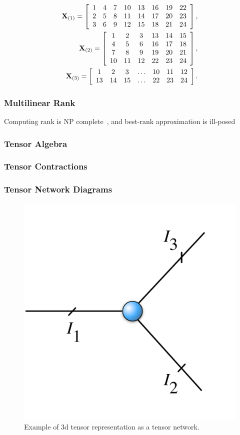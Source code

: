 \begin{equation}
\label{eq:moden-matricization}
\begin{split}
\M{X}_{(1)} = \left[
\begin{array}{cccccccc}
1 & 4 & 7 & 10 & 13 & 16 & 19 & 22 \\
2 & 5 & 8 & 11 & 14 & 17 & 20 & 23 \\
3 & 6 & 9 & 12 & 15 & 18 & 21 & 24 
\end{array}
\right],\\
\M{X}_{(2)} = \left[
\begin{array}{cccccc}
1 & 2 & 3 & 13 & 14 & 15 \\
4 & 5 & 6 & 16 & 17 & 18 \\
7 & 8 & 9 & 19 & 20 & 21 \\
10 & 11 & 12 & 22 & 23 & 24 
\end{array}
\right],\\
\M{X}_{(3)} = \left[
\begin{array}{ccccccc}
1 & 2 & 3 & \dots & 10 & 11 & 12 \\
13 & 14 & 15 & \dots & 22 & 23 & 24
\end{array}
\right].
\end{split}
\end{equation}

\subsubsection{Multilinear Rank}
Computing rank is NP complete~\cite{HastadRanknp}, and best-rank approximation is ill-posed~\cite{Kolda09tensordecompositions}
\subsubsection{Tensor Algebra}

\subsubsection{Tensor Contractions}

\subsubsection{Tensor Network Diagrams}
\begin{figure}
  \centering\includegraphics[width=0.3\linewidth]{figs/3dtensornet}
  \caption{Example of 3d tensor representation as a tensor network.}
  \label{fig:3dtensornet}
\end{figure}
